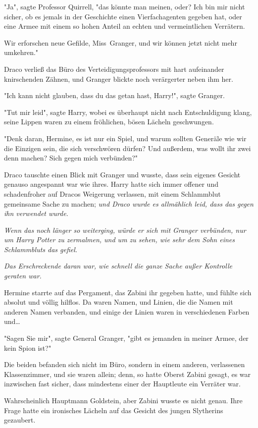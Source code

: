 {"Ja", sagte Professor Quirrell, "das könnte man meinen, oder? Ich bin mir nicht sicher, ob es jemals in der Geschichte einen Vierfachagenten gegeben hat, oder eine Armee mit einem so hohen Anteil an echten und vermeintlichen Verrätern.

Wir erforschen neue Gefilde, Miss~Granger, und wir können jetzt nicht mehr umkehren."

Draco verließ das Büro des Verteidigungsprofessors mit hart aufeinander knirschenden Zähnen, und Granger blickte noch verärgerter neben ihm her.

"Ich kann nicht glauben, dass du das getan hast, Harry!", sagte Granger.

"Tut mir leid", sagte Harry, wobei es überhaupt nicht nach Entschuldigung klang, seine Lippen waren zu einem fröhlichen, bösen Lächeln geschwungen.

"Denk daran, Hermine, es ist nur ein Spiel, und warum sollten Generäle wie wir die Einzigen sein, die sich verschwören dürfen? Und außerdem, was wollt ihr zwei denn machen? Sich gegen mich verbünden?"

Draco tauschte einen Blick mit Granger und wusste, dass sein eigenes Gesicht genauso angespannt war wie ihres. Harry hatte sich immer offener und schadenfroher auf Dracos Weigerung verlassen, mit einem Schlammblut gemeinsame Sache zu machen; \emph{und Draco wurde es allmählich leid, dass das gegen ihn verwendet wurde.}

\emph{Wenn das noch länger so weiterging, würde er sich mit Granger verbünden, nur um Harry Potter zu zermalmen, und um zu sehen, wie sehr dem Sohn eines Schlammbluts das gefiel.}

\emph{Das Erschreckende daran war, wie schnell die ganze Sache außer Kontrolle geraten war.}

Hermine starrte auf das Pergament, das Zabini ihr gegeben hatte, und fühlte sich absolut und völlig hilflos. Da waren Namen, und Linien, die die Namen mit anderen Namen verbanden, und einige der Linien waren in verschiedenen Farben und…

"Sagen Sie mir", sagte General Granger, "gibt es jemanden in meiner Armee, der kein Spion ist?"

Die beiden befanden sich nicht im Büro, sondern in einem anderen, verlassenen Klassenzimmer, und sie waren allein; denn, so hatte Oberst Zabini gesagt, es war inzwischen fast sicher, dass mindestens einer der Hauptleute ein Verräter war.

Wahrscheinlich Hauptmann Goldstein, aber Zabini wusste es nicht genau. Ihre Frage hatte ein ironisches Lächeln auf das Gesicht des jungen Slytherins gezaubert.

}
